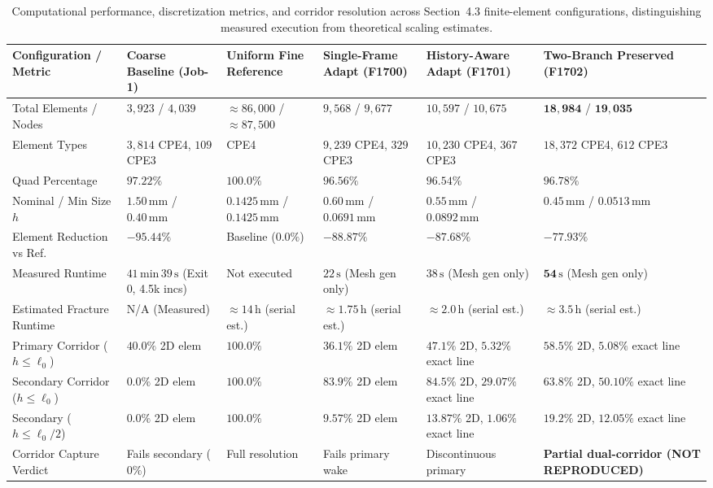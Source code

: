 \begin{table}[htbp]
\centering
\scriptsize
\renewcommand{\arraystretch}{0.90}
\caption{Computational performance, discretization metrics, and corridor resolution across Section~4.3 finite-element configurations, distinguishing measured execution from theoretical scaling estimates.}
\label{tab:f1702_computational_performance}
\begin{tabularx}{\textwidth}{p{2.8cm}XXXXX}
\hline
\textbf{Configuration / Metric} & \textbf{Coarse Baseline (Job-1)} & \textbf{Uniform Fine Reference} & \textbf{Single-Frame Adapt (F1700)} & \textbf{History-Aware Adapt (F1701)} & \textbf{Two-Branch Preserved (F1702)} \\
\hline
Total Elements / Nodes & $3{,}923$ / $4{,}039$ & $\approx 86{,}000$ / $\approx 87{,}500$ & $9{,}568$ / $9{,}677$ & $10{,}597$ / $10{,}675$ & $\mathbf{18{,}984}$ / $\mathbf{19{,}035}$ \\
Element Types & $3{,}814$ CPE4, $109$ CPE3 & CPE4 & $9{,}239$ CPE4, $329$ CPE3 & $10{,}230$ CPE4, $367$ CPE3 & $18{,}372$ CPE4, $612$ CPE3 \\
Quad Percentage & $97.22\%$ & $100.0\%$ & $96.56\%$ & $96.54\%$ & $\mathbf{96.78\%}$ \\
Nominal / Min Size $h$ & $1.50\,\mathrm{mm}$ / $0.40\,\mathrm{mm}$ & $0.1425\,\mathrm{mm}$ / $0.1425\,\mathrm{mm}$ & $0.60\,\mathrm{mm}$ / $0.0691\,\mathrm{mm}$ & $0.55\,\mathrm{mm}$ / $0.0892\,\mathrm{mm}$ & $\mathbf{0.45\,\mathrm{mm}}$ / $\mathbf{0.0513\,\mathrm{mm}}$ \\
Element Reduction vs Ref. & $-95.44\%$ & Baseline ($0.0\%$) & $-88.87\%$ & $-87.68\%$ & $\mathbf{-77.93\%}$ \\
Measured Runtime & $41\,\mathrm{min}\,39\,\mathrm{s}$ (Exit 0, 4.5k incs) & Not executed & $22\,\mathrm{s}$ (Mesh gen only) & $38\,\mathrm{s}$ (Mesh gen only) & $\mathbf{54\,\mathrm{s}}$ (Mesh gen only) \\
Estimated Fracture Runtime & N/A (Measured) & $\approx 14\,\mathrm{h}$ (serial est.) & $\approx 1.75\,\mathrm{h}$ (serial est.) & $\approx 2.0\,\mathrm{h}$ (serial est.) & $\mathbf{\approx 3.5\,\mathrm{h}}$ (serial est.) \\
Primary Corridor ($h \le \ell_0$) & $40.0\%$ 2D elem & $100.0\%$ & $36.1\%$ 2D elem & $47.1\%$ 2D, $5.32\%$ exact line & $\mathbf{58.5\%}$ 2D, $\mathbf{5.08\%}$ exact line \\
Secondary Corridor ($h \le \ell_0$) & $0.0\%$ 2D elem & $100.0\%$ & $83.9\%$ 2D elem & $84.5\%$ 2D, $29.07\%$ exact line & $\mathbf{63.8\%}$ 2D, $\mathbf{50.10\%}$ exact line \\
Secondary ($h \le \ell_0/2$) & $0.0\%$ 2D elem & $100.0\%$ & $9.57\%$ 2D elem & $13.87\%$ 2D, $1.06\%$ exact line & $\mathbf{19.2\%}$ 2D, $\mathbf{12.05\%}$ exact line \\
Corridor Capture Verdict & Fails secondary ($0\%$) & Full resolution & Fails primary wake & Discontinuous primary & \textbf{Partial dual-corridor (NOT REPRODUCED)} \\
\hline
\end{tabularx}
\end{table}

